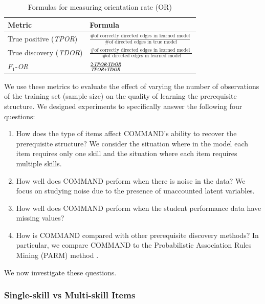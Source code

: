 \documentclass{edm_template}
\begin{document}
	
	\begin{table}[th]
		\centering
		\caption{Formulas for measuring orientation rate (OR) \label{tbl:or}}
		\label{my-label}
		\begin{tabular}{@{}ll@{}}
			\toprule
			Metric & Formula \\ \midrule
			True positive  (\emph{TPOR}) & $\frac{ \text{\# of correctly directed edges in learned model} } {\text{ \# of directed edges in true model}}$  \\
			True discovery   (\emph{TDOR})& $\frac{ \text{\# of correctly directed edges in learned model } }{\text{ \# of directed edges in learned model}} $\\
			$F_1$-\textit{OR} &  $\frac{  2\cdot \text{\emph{TPOR}} \cdot \text{\emph{TDOR}} }{\text{\emph{TPOR}}+\text{\emph{TDOR}}}$ \\
			\bottomrule
		\end{tabular}
	\end{table}
	
	We use these metrics to evaluate the effect of varying the  number of observations  of the training set (sample size) on the quality of learning the prerequisite structure.
	We designed experiments to specifically answer the following four questions:
	\begin{enumerate}[noitemsep,topsep=2pt,parsep=0pt,partopsep=0pt]
		\item How does the type of items affect COMMAND's ability to recover the prerequisite structure?
		We consider the situation where in the model each item requires only one skill and the situation where each item requires multiple skills. 
		\item How well does COMMAND perform when there is noise in the data?
		We focus on studying noise due to the presence of unaccounted latent variables.
		\item How well does COMMAND perform when the student performance data have missing values?
		\item How is COMMAND compared with other prerequisite discovery methods?
		In particular, we compare COMMAND to the Probabilistic Association Rules Mining (PARM) method \cite{chen2015discovering}.
	\end{enumerate}
	We now investigate these questions.


	\subsubsection{Single-skill vs Multi-skill Items}
	
\end{document}
